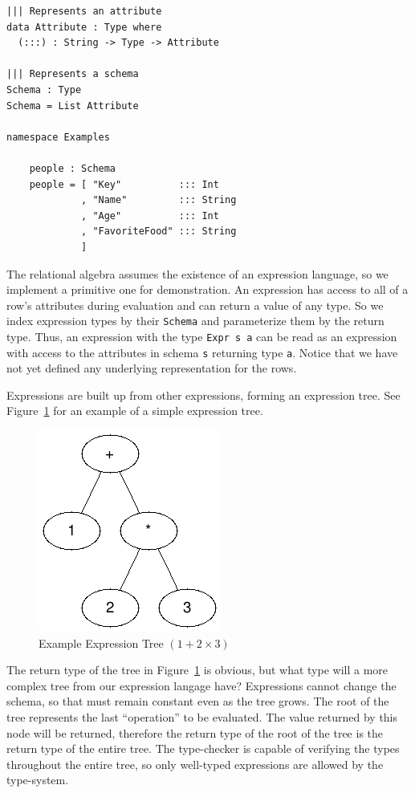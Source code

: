 \documentclass[12pt]{article}
\begin{document}
\begin{lstlisting}
||| Represents an attribute
data Attribute : Type where
  (:::) : String -> Type -> Attribute

||| Represents a schema
Schema : Type
Schema = List Attribute

namespace Examples

    people : Schema
    people = [ "Key"          ::: Int 
             , "Name"         ::: String
             , "Age"          ::: Int
             , "FavoriteFood" ::: String
             ]
\end{lstlisting}

The relational algebra assumes the existence of an expression language, so we implement a primitive one for demonstration.
An expression has access to all of a row's attributes during evaluation and can return a value of any type.
So we index expression types by their \texttt{Schema} and parameterize them by the return type.
Thus, an expression with the type \texttt{Expr s a} can be read as an expression with access to the attributes in schema \texttt{s} returning type \texttt{a}.
Notice that we have not yet defined any underlying representation for the rows.

Expressions are built up from other expressions, forming an expression tree.
See Figure~\ref{fig:expr_tree} for an example of a simple expression tree.

\begin{figure}[h!]
    \centering
    \includegraphics[width=0.25\linewidth]{assets/expr_tree.png}
    \caption{Example Expression Tree $(1 + 2 \times 3)$}
    \label{fig:expr_tree}
\end{figure}

The return type of the tree in Figure~\ref{fig:expr_tree} is obvious, but what type will a more complex tree from our expression langage have?
Expressions cannot change the schema, so that must remain constant even as the tree grows.
The root of the tree represents the last ``operation'' to be evaluated.
The value returned by this node will be returned, therefore the return type of the root of the tree is the return type of the entire tree.
The type-checker is capable of verifying the types throughout the entire tree, so only well-typed expressions are allowed by the type-system.
\end{document}
